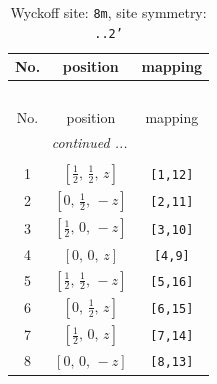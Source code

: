 \documentclass[fleqn,8pt]{jsarticle}
\begin{document}
\renewcommand{\arraystretch}{1.2}
\begin{longtable}{ccc}
\caption{Wyckoff site: {\tt 8m}, site symmetry: {\tt ..2'}}
 \\
 \hline \hline
No. & position & mapping \\ \hline \endfirsthead

\multicolumn{2}{l}{\tablename\ \thetable{}} \\
 \hline \hline
No. & position & mapping \\ \hline \endhead

 \hline \hline
\multicolumn{2}{r}{\footnotesize\it continued ...} \\ \endfoot

 \hline \hline
\multicolumn{2}{r}{} \\ \endlastfoot

1 & $\left[ \frac{1}{2},\, \frac{1}{2},\, z \right]$ & {\tt [1,12]} \\ \hline
2 & $\left[ 0,\, \frac{1}{2},\, - z \right]$ & {\tt [2,11]} \\ \hline
3 & $\left[ \frac{1}{2},\, 0,\, - z \right]$ & {\tt [3,10]} \\ \hline
4 & $\left[ 0,\, 0,\, z \right]$ & {\tt [4,9]} \\ \hline
5 & $\left[ \frac{1}{2},\, \frac{1}{2},\, - z \right]$ & {\tt [5,16]} \\ \hline
6 & $\left[ 0,\, \frac{1}{2},\, z \right]$ & {\tt [6,15]} \\ \hline
7 & $\left[ \frac{1}{2},\, 0,\, z \right]$ & {\tt [7,14]} \\ \hline
8 & $\left[ 0,\, 0,\, - z \right]$ & {\tt [8,13]} \\
\end{longtable}
\renewcommand{\arraystretch}{1.2}
\end{document}
